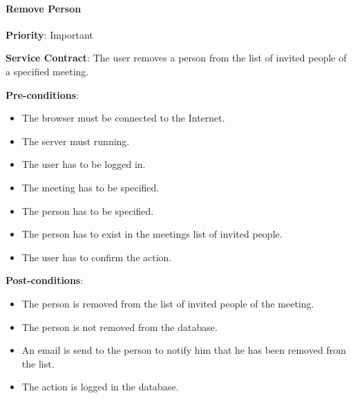     	\paragraph{Remove Person}
			\begin{description}
			    \item{\textbf{Priority}:} Important
			    \item{\textbf{Service Contract}:} The user removes a person from the list of invited people of a specified meeting.
			    \item{\textbf{Pre-conditions}:}
    			    \begin{itemize}
    			        \item The browser must be connected to the Internet.
    			        \item The server must running.    	       
    			        \item The user has to be logged in. 
    			        \item The meeting has to be specified.
    			        \item The person has to be specified.
    			        \item The person has to exist in the meetings list of invited people.
    			        \item The user has to confirm the action.
    			    \end{itemize}
			    \item{\textbf{Post-conditions}:} 
    			    \begin{itemize}
    			      \item The person is removed from the list of invited people of the meeting.
    			      \item The person is not removed from the database. 
    			      \item An email is send to the person to notify him that he has been removed from the list.
    			      \item The action is logged in the database.
    			    \end{itemize}
			\end{description}	
			
